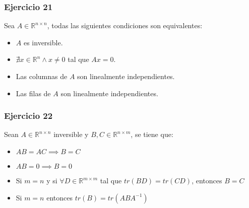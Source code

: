 \subsubsection{Ejercicio 21}
\label{subsubsec:guia_1_ej_21}

Sea $A \in \mathbb{R}^{n \times n}$, todas las siguientes condiciones son equivalentes:
\begin{itemize}
    \item $A$ es inversible.
    \item $\nexists x \in \mathbb{R}^{n} \land x\neq 0$ tal que $Ax = 0$.
    \item Las columnas de $A$ son linealmente independientes.
    \item Las filas de $A$ son linealmente independientes.
\end{itemize}

\subsubsection{Ejercicio 22}
\label{subsubsec:guia_1_ej_22}

Sean $A \in \mathbb{R}^{n \times n}$ inversible y $B, C \in \mathbb{R}^{n \times m}$, se tiene que:

\begin{itemize}
    \item $AB = AC \implies B = C$
    \item $AB = 0 \implies B = 0$
    \item Si $m = n$ y si $\forall D \in \mathbb{R}^{m \times m}$ tal que $tr(BD) = tr(CD)$, entonces $B = C$
    \item Si $m = n$ entonces $tr(B) = tr(ABA^{-1})$
\end{itemize}
